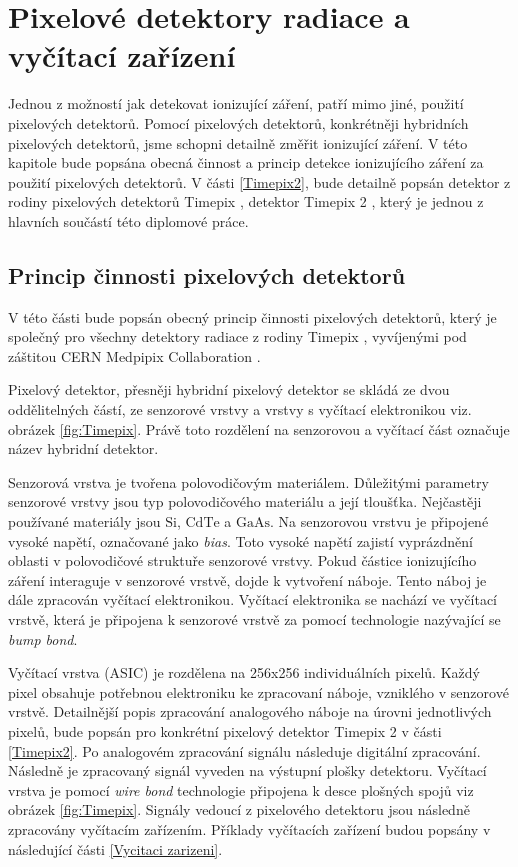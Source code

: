 \chapter{Pixelové detektory radiace a vyčítací zařízení}	%
\label{kap:2}
Jednou z možností jak detekovat ionizující záření, patří mimo jiné, použití pixelových detektorů. Pomocí pixelových detektorů, konkrétněji hybridních pixelových detektorů, jsme schopni detailně změřit ionizující záření. V této kapitole bude popsána obecná činnost a princip detekce ionizujícího záření za použití pixelových detektorů. V části \ref{Timepix2}, bude detailně popsán detektor z rodiny pixelových detektorů Timepix \cite{Llopart}, detektor Timepix 2 \cite{tpx2_manual}, který je jednou z hlavních součástí této diplomové práce.

\section{Princip činnosti pixelových detektorů}
\label{kap:2.1}
V této části bude popsán obecný princip činnosti pixelových detektorů, který je společný pro všechny detektory radiace z rodiny Timepix \cite{Llopart}, vyvíjenými pod záštitou CERN Medpipix Collaboration \cite{Medpix}. 
\par Pixelový detektor, přesněji hybridní pixelový detektor se skládá ze dvou oddělitelných částí, ze senzorové vrstvy a vrstvy s vyčítací elektronikou viz. obrázek \ref{fig:Timepix}. Právě toto rozdělení na senzorovou a vyčítací část označuje název hybridní detektor.
\par Senzorová vrstva je tvořena polovodičovým materiálem. Důležitými parametry senzorové vrstvy jsou typ polovodičového materiálu a její tloušťka. Nejčastěji používané materiály jsou $\text{Si}$, $\text{CdTe}$ a $\text{GaAs}$. Na senzorovou vrstvu je připojené vysoké napětí, označované jako \textit{bias}. Toto vysoké napětí zajistí vyprázdnění oblasti v polovodičové struktuře senzorové vrstvy. Pokud částice ionizujícího záření interaguje v senzorové vrstvě, dojde k vytvoření náboje. Tento náboj je dále zpracován vyčítací elektronikou. Vyčítací elektronika se nachází ve vyčítací vrstvě, která je připojena k senzorové vrstvě za pomocí technologie nazývající se \textit{bump bond}.
\par Vyčítací vrstva (ASIC) je rozdělena na 256x256 individuálních pixelů. Každý pixel obsahuje potřebnou elektroniku ke zpracovaní náboje, vzniklého v senzorové vrstvě. Detailnější popis zpracování analogového náboje na úrovni jednotlivých pixelů, bude popsán pro konkrétní pixelový detektor Timepix 2 v části \ref{Timepix2}. Po analogovém zpracování signálu následuje digitální zpracování. Následně je zpracovaný signál vyveden na výstupní plošky detektoru. Vyčítací vrstva je pomocí \textit{wire bond} technologie připojena k desce plošných spojů viz obrázek \ref{fig:Timepix}. Signály vedoucí z pixelového detektoru jsou následně zpracovány vyčítacím zařízením. Příklady vyčítacích zařízení budou popsány v následující části \ref{Vycitaci zarizeni}.
